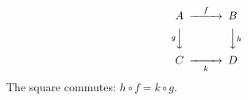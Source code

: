 \documentclass{article}
\begin{document}
\[
\begin{CD}
A @>f>> B \\
@VgVV @VVhV \\
C @>>k> D
\end{CD}
\]
The square commutes: $h\circ f=k\circ g$.
\end{document}
